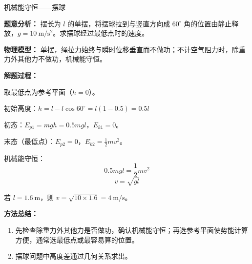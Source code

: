 \begin{examplebox}{机械能守恒——摆球}

\textbf{题意分析：} 摆长为 $l$ 的单摆，将摆球拉到与竖直方向成 $60^\circ$ 角的位置由静止释放，$g = 10\ \mathrm{m/s^2}$。求摆球经过最低点时的速度。

\textbf{物理模型：} 单摆，绳拉力始终与瞬时位移垂直而不做功；不计空气阻力时，除重力外其他力不做功，机械能守恒。

\textbf{解题过程：}

取最低点为参考平面（$h=0$）。

初始高度：$h = l - l\cos 60^\circ = l(1 - 0.5) = 0.5l$

初态：$E_{p1} = mgh = 0.5 mgl$，$E_{k1} = 0$。

末态（最低点）：$E_{p2} = 0$，$E_{k2} = \frac12 mv^2$。

机械能守恒：
\[
0.5 mgl = \frac12 mv^2
\]
\[
v = \sqrt{gl}
\]

若 $l = 1.6\ \mathrm{m}$，则 $v = \sqrt{10 \times 1.6} = 4\ \mathrm{m/s}$。

\textbf{方法总结：}
\begin{enumerate}
  \item 先检查除重力外其他力是否做功，确认机械能守恒；再选参考平面使势能计算方便，通常选最低点或最容易算的位置。
  \item 摆球问题中高度差通过几何关系求出。
\end{enumerate}

\end{examplebox}

